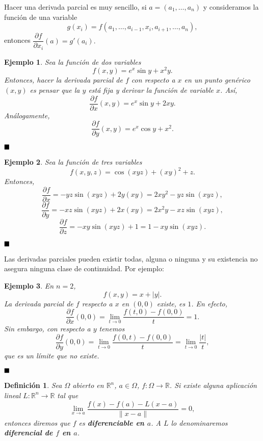\documentclass[12pt]{article}
\newtheorem{definition}[theorem]{Definición}
\newtheorem{example}{Ejemplo}[theorem]
\providecommand{\norm}[1]{\lVert#1\rVert}
\begin{document}
Hacer una derivada parcial es muy sencillo, si $a=(a_1, \ldots, a_n)$ y consideramos la función de una variable $$g(x_i)= f(a_1, 	\ldots, a_{i-1}, x_i, a_{i+1}, \ldots, a_n),$$ entonces $\dfrac{\partial f}{\partial x_i}(a) = g'(a_i).$

\begin{example} Sea la función de dos variables $$f(x,y) = e^x\sin y + x^2 y.$$ Entonces, hacer la derivada parcial de $f$ con respecto a $x$ en un punto genérico $(x,y)$ es pensar que la $y$ está fija y derivar la función de variable $x$. Así, $$\dfrac{\partial f}{\partial x}(x,y)=e^x\sin y +2xy.$$
Análogamente, $$\dfrac{\partial f}{\partial y}(x,y) = e^x\cos y + x^2.$$
\end{example}
$\hfill \blacksquare$

\begin{example}Sea la función de tres variables $$f(x,y,z)=\cos(xyz) + (xy)^2 + z.$$ Entonces, $$\dfrac{\partial f}{\partial x} = -yz \sin(xyz) +2y(xy) = 2xy^2 -yz \sin(xyz),$$ $$\dfrac{\partial f}{\partial y} = -xz \sin(xyz) +2x(xy) = 2x^2y -xz \sin(xyz),$$ $$\dfrac{\partial f}{\partial z} = -xy \sin(xyz) +1 = 1 -xy \sin(xyz).$$
\end{example}
$\hfill \blacksquare$

Las derivadas parciales pueden existir todas, alguna o ninguna y su existencia no asegura ninguna clase de continuidad. Por ejemplo: 

\begin{example}En $n=2$, $$f(x,y) = x+|y|.$$ La derivada parcial de $f$ respecto a $x$ en $(0,0)$ existe, es $1$. En efecto, $$\dfrac{\partial f}{\partial x}(0,0) = \lim_{t\rightarrow 0} \dfrac{f(t,0)-f(0,0)}{t} = 1.$$ Sin embargo, con respecto a $y$ tenemos $$\dfrac{\partial f}{\partial y} (0,0)= \lim_{t\rightarrow 0} \dfrac{f(0,t)-f(0,0)}{t} = \lim _{t \rightarrow 0} \dfrac{|t|}{t},$$ que es un límite que no existe.
\end{example}
$\hfill \blacksquare$

\begin{definition}Sea $\Omega$ abierto en $\mathbb{R}^n$, $a \in \Omega$, $f \colon \Omega \longrightarrow \mathbb{R}$. Si existe alguna aplicación lineal $L \colon \mathbb{R}^n \longrightarrow \mathbb{R}$ tal que $$\lim_{x\rightarrow a} \dfrac{f(x)-f(a)-L(x-a)}{\norm{x-a}} = 0,$$ entonces diremos que $f$ es \textbf{diferenciable en $a$}. A $L$ lo denominaremos \textbf{diferencial de $f$ en $a$}.
\end{definition}
\end{document}
